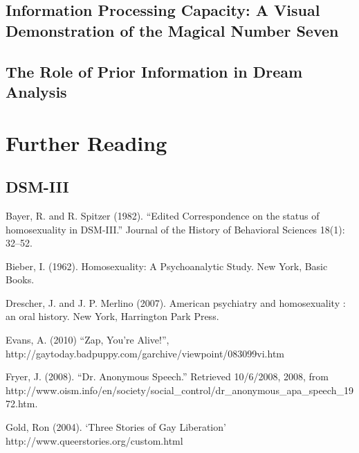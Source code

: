 \begin{refsection}
\begin{appendices}
\label{app: interobserverreliability}


\subsection{Information Processing Capacity: A Visual Demonstration of the Magical Number Seven}
\label{informationprocessingcapacity:avisualdemonstrationofthemagicalnumberseven}

\label{app: magicseven}


\subsection{The Role of Prior Information in Dream Analysis}
\label{theroleofpriorinformationindreamanalysis}

\label{app: dreamanalysis}


\pagebreak 

\section{Further Reading}
\label{furtherreading}

\subsection{DSM-III}
\label{dsm-iii}

Bayer, R. and R. Spitzer (1982). ``Edited Correspondence on the status of homosexuality in DSM-III.'' Journal of the History of Behavioral Sciences 18(1): 32--52.

Bieber, I. (1962). Homosexuality: A Psychoanalytic Study. New York, Basic Books.

Drescher, J. and J. P. Merlino (2007). American psychiatry and homosexuality : an oral history. New York, Harrington Park Press.

Evans, A. (2010) “Zap, You're Alive!”, http:\slash \slash gaytoday.badpuppy.com\slash garchive\slash viewpoint\slash 083099vi.htm

Fryer, J. (2008). ``Dr. Anonymous Speech.'' Retrieved 10\slash 6\slash 2008, 2008, from http:\slash \slash www.oism.info\slash en\slash society\slash social\_control\slash dr\_anonymous\_apa\_speech\_1972.htm.

Gold, Ron (2004). ‘Three Stories of Gay Liberation’ http:\slash \slash www.queerstories.org\slash custom.html


\end{appendices}
\end{refsection}
